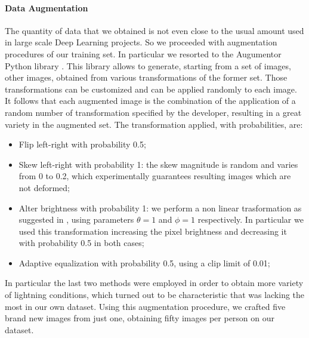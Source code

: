 \paragraph{Data Augmentation}
The quantity of data that we obtained is not even close to the usual amount used in large scale Deep Learning projects. So we proceeded with augmentation procedures of our training set. In particular we resorted to the Augumentor Python library \cite{augmentor}. This library allows to generate, starting from a set of images, other images, obtained from various transformations of the former set. Those transformations can be customized and can be applied randomly to each image. It follows that each augmented image is the combination of the application of a random number of transformation specified by the developer, resulting in a great variety in the augmented set.
The transformation applied, with probabilities, are:
\begin{itemize}
\item Flip left-right with probability 0.5;
\item Skew left-right with probability 1: the skew magnitude is random and varies from 0 to 0.2, which experimentally guarantees resulting images which are not deformed;
\item Alter brightness with probability 1: we perform a non linear trasformation as suggested in \cite{nonlintransf}, using parameters $\theta = 1$ and $\phi = 1$ respectively. In particular we used this transformation increasing the pixel brightness and decreasing it with probability 0.5 in both cases;
\item Adaptive equalization \cite{histeq} with probability 0.5, using a clip limit of 0.01;
\end{itemize}
In particular the last two methods were employed in order to obtain more variety of lightning conditions, which turned out to be characteristic that was lacking the most in our own dataset.
Using this augmentation procedure, we crafted five brand new images from just one, obtaining fifty images per person on our dataset.

